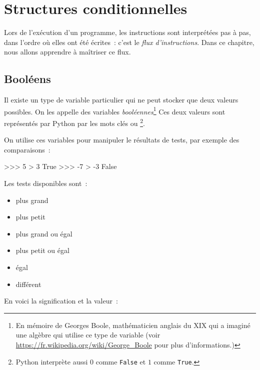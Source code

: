 

\chapter{Structures conditionnelles}

Lors de l'exécution d'un programme, les instructions sont interprétées pas à pas,
dans l'ordre où elles ont été écrites~: c'est le \textit{flux d'instructions}. Dans ce chapitre,
nous allons apprendre à maîtriser ce flux.

\section{Booléens}

Il existe un type de variable particulier qui ne peut stocker que deux valeurs possibles. On les
appelle des variables \textit{booléennes}\footnote{En mémoire de Georges \textsf{Boole},
mathématicien anglais du XIX\ieme{} qui a imaginé une algèbre qui utilise ce type de variable
(voir \url{https://fr.wikipedia.org/wiki/George_Boole}
pour plus d'informations.)}
Ces deux valeurs sont représentés par Python par les mots clés 
ou \footnote{Python interprète aussi $0$ comme \texttt{False}
et $1$ comme \texttt{True}.}.

On utilise ces variables pour manipuler le résultats de tests, par exemple des comparaisons~:
\begin{pythoncode}
>>> 5 > 3
True
>>> -7 > -3
False
\end{pythoncode}

Les tests disponibles sont~:
\vspace*{-3mm}
\begin{multicols}{2}
\begin{itemize}
	\item plus grand \motcle{>}
	\item plus petit \motcle{<}
	\item plus grand ou égal \motcle{>=}
	\item plus petit ou égal \motcle{<=}
	\item égal \motcle{==}
	\item différent \motcle{!=}
\end{itemize}
\end{multicols}

En voici la signification et la valeur~:

